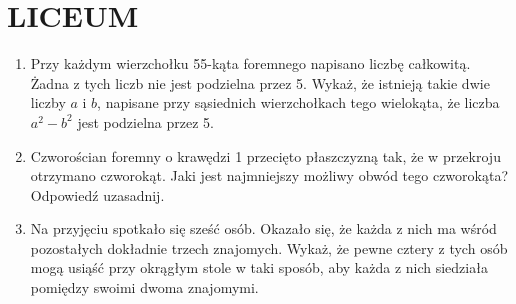 \documentclass[10pt]{article}
\begin{document}
\section*{LICEUM}
\begin{enumerate}
  \item Przy każdym wierzchołku 55-kąta foremnego napisano liczbę całkowitą. Żadna z tych liczb nie jest podzielna przez 5. Wykaż, że istnieją takie dwie liczby \(a\) i \(b\), napisane przy sąsiednich wierzchołkach tego wielokąta, że liczba \(a^{2}-b^{2}\) jest podzielna przez 5.
  \item Czworościan foremny o krawędzi 1 przecięto płaszczyzną tak, że w przekroju otrzymano czworokąt. Jaki jest najmniejszy możliwy obwód tego czworokąta? Odpowiedź uzasadnij.
  \item Na przyjęciu spotkało się sześć osób. Okazało się, że każda z nich ma wśród pozostałych dokładnie trzech znajomych. Wykaż, że pewne cztery z tych osób mogą usiąść przy okrągłym stole w taki sposób, aby każda z nich siedziała pomiędzy swoimi dwoma znajomymi.
\end{enumerate}
\end{document}
